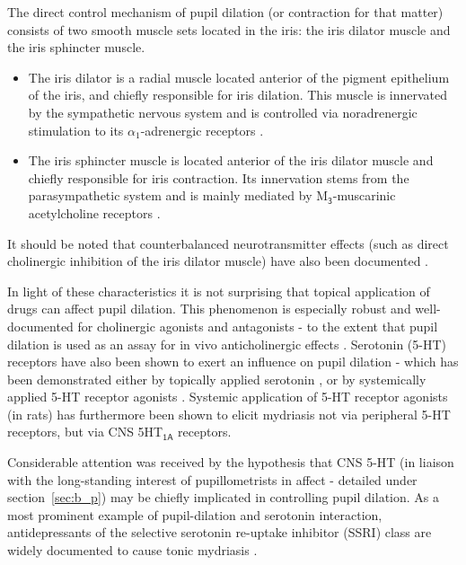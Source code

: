 	The direct control mechanism of pupil dilation (or contraction for that matter) consists of two smooth muscle sets located in the iris: the iris dilator muscle and the iris sphincter muscle.
	\begin{itemize}
	    \item The iris dilator is a radial muscle located anterior of the pigment epithelium of the iris, and chiefly responsible for iris dilation.
	    This muscle is innervated by the sympathetic nervous system and is controlled via noradrenergic stimulation to its $\alpha_1$-adrenergic receptors \citep{vanAlphen1976}.
	    \item The iris sphincter muscle is located anterior of the iris dilator muscle and chiefly responsible for iris contraction.
	    Its innervation stems from the parasympathetic system and is mainly mediated by M$\mathsf{_3}$-muscarinic acetylcholine receptors \citep{Woldemussie1993,Taylor1974}.
	\end{itemize}
	It should be noted that counterbalanced neurotransmitter effects (such as direct cholinergic inhibition of the iris dilator muscle) have also been documented \citep{Yoshitomi1985}.
	
	In light of these characteristics it is not surprising that topical application of drugs can affect pupil dilation.
	This phenomenon is especially robust and well-documented for cholinergic agonists \citep{Smith1978} and antagonists \citep{Gambill1967} -
	to the extent that pupil dilation is used as an assay for in vivo anticholinergic effects \citep{Bye1979}.
	Serotonin (5-HT) receptors have also been shown to exert an influence on pupil dilation - which has been demonstrated either by topically applied serotonin \citep{KOELLA1962}, or by systemically applied 5-HT receptor agonists \citep{Yu2004}.
	Systemic application of 5-HT receptor agonists (in rats) has furthermore been shown to elicit mydriasis not via peripheral 5-HT receptors, but via CNS 5HT$\mathsf{_{1A}}$ receptors.
	
	Considerable attention was received by the hypothesis that CNS 5-HT (in liaison with the long-standing interest of pupillometrists in affect - detailed under section~\ref{sec:b_p}) may be chiefly implicated in controlling pupil dilation.
	As a most prominent example of pupil-dilation and serotonin interaction, antidepressants of the selective serotonin re-uptake inhibitor (SSRI) class are widely documented to cause tonic mydriasis \citep{Fitzgerald2013,Klein-Schwartz2012}.
	
